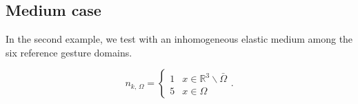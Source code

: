 \documentclass[a4paper,11pt]{article}
\theoremstyle{remark}
\theoremstyle{definition}
\numberwithin{equation}{section}
\begin{document}
%


%
%


\subsection{Medium case}

In the second example, we test with an inhomogeneous elastic medium among the six reference gesture domains.

\[
n_{k,\,\Omega}=\begin{cases}
1 & x\in\mathbb{R}^{3}\backslash\bar{\Omega}\\
5 & x\in\Omega
\end{cases}.
\]
\end{document}
